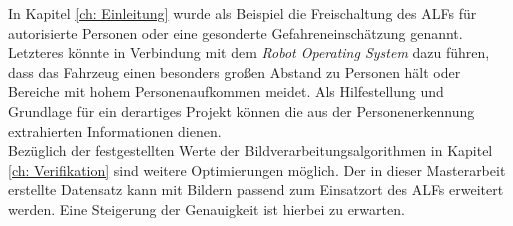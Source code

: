 In Kapitel \ref{ch: Einleitung} wurde als Beispiel die Freischaltung des ALFs für autorisierte Personen oder eine gesonderte Gefahreneinschätzung genannt. Letzteres könnte in Verbindung mit dem \textit{Robot Operating System} dazu führen, dass das Fahrzeug einen besonders großen Abstand zu Personen hält oder Bereiche mit hohem Personenaufkommen meidet. Als Hilfestellung und Grundlage für ein derartiges Projekt können die aus der Personenerkennung extrahierten Informationen dienen. \\

Bezüglich der festgestellten Werte der Bildverarbeitungsalgorithmen in Kapitel \ref{ch: Verifikation} sind weitere Optimierungen möglich. Der in dieser Masterarbeit erstellte Datensatz kann mit Bildern passend zum Einsatzort des ALFs erweitert werden. Eine Steigerung der Genauigkeit ist hierbei zu erwarten.\\





